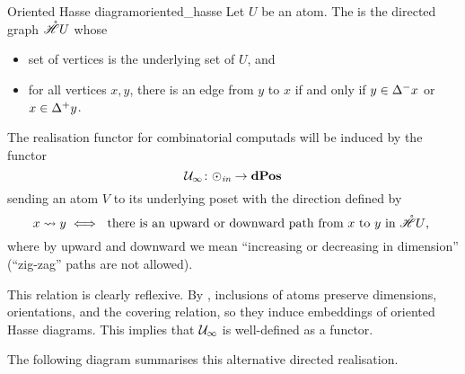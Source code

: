 \begin{cdef}{Oriented Hasse diagram}{oriented_hasse}
Let \( U \) be an atom.
The  is the directed graph \( \mathring{\mathscr{H}}{U} \) whose
\begin{itemize}
    \item set of vertices is the underlying set of \( U \), and
    \item for all vertices \( x, y \), there is an edge from \( y \) to \( x \) if and only if \( y \in \Delta_{}^{-}x \) or \( x \in \Delta_{}^{+}y \).
\end{itemize}
\end{cdef}

The realisation functor for combinatorial computads will be induced by the functor
\begin{equation*}
	\mathcal{U}_\infty\colon \odot_\textit{in} \to \mathbf{dPos}
\end{equation*}
sending an atom \( V \) to its underlying poset with the direction defined by
\begin{equation*}
	x \rightsquigarrow y \iff 
	\text{ there is an upward or downward path from \( x \) to \( y \) in \( \mathring{\mathscr{H}}{U} \), }
\end{equation*}
where by upward and downward we mean ``increasing or decreasing in dimension'' (``zig-zag'' paths are not allowed).

This relation is clearly reflexive.
By \cite[Lemma 1.11]{hadzihasanovic_diagrammatic_2020}, inclusions of atoms preserve dimensions, orientations, and the covering relation, so they induce embeddings of oriented Hasse diagrams.
This implies that \( \mathcal{U}_\infty \) is well-defined as a functor.

The following diagram summarises this alternative directed realisation.

\begin{center}
\end{center}

